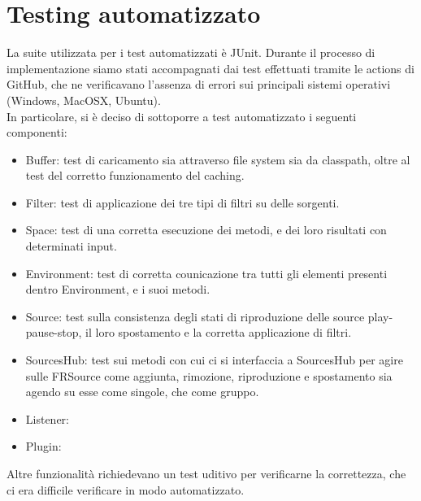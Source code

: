 \documentclass[a4paper,12pt]{report}
\begin{document}
\section{Testing automatizzato}
La suite utilizzata per i test automatizzati è JUnit. Durante il processo di implementazione siamo stati accompagnati dai test effettuati tramite le actions di GitHub, che ne verificavano l'assenza di errori sui principali sistemi operativi (Windows, MacOSX, Ubuntu).
\\In particolare, si è deciso di sottoporre a test automatizzato i seguenti componenti:
\begin{itemize}
	\item Buffer: test di caricamento sia attraverso file system sia da classpath, oltre al test del corretto funzionamento del caching.
	\item Filter: test di applicazione dei tre tipi di filtri su delle sorgenti.
	\item Space: test di una corretta esecuzione dei metodi, e dei loro risultati con determinati input.
	\item Environment: test di corretta counicazione tra tutti gli elementi presenti dentro Environment, e i suoi metodi.
	\item Source: test sulla consistenza degli stati di riproduzione delle source play-pause-stop, il loro spostamento e la corretta applicazione di filtri.
	\item SourcesHub: test sui metodi con cui ci si interfaccia a SourcesHub per agire sulle FRSource come aggiunta, rimozione, riproduzione e spostamento sia agendo su esse come singole, che come gruppo.
	\item Listener: 
	\item Plugin: 
\end{itemize}
Altre funzionalità richiedevano un test uditivo per verificarne la correttezza, che ci era difficile verificare in modo automatizzato.
%
\end{document}
